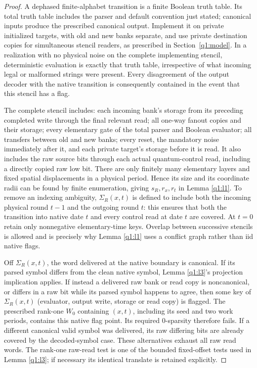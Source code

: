 \begin{proof}
A dephased finite-alphabet transition is a finite Boolean truth table. Its total truth table includes the parser and default convention just stated; canonical inputs produce the prescribed canonical output. Implement it on private initialized targets, with old and new banks separate, and use private destination copies for simultaneous stencil readers, as prescribed in Section~\ref{q1:model}. In a realization with no physical noise on the complete implementing stencil, deterministic evaluation is exactly that truth table, irrespective of what incoming legal or malformed strings were present. Every disagreement of the output decoder with the native transition is consequently contained in the event that this stencil has a flag.

The complete stencil includes: each incoming bank's storage from its preceding completed write through the final relevant read; all one-way fanout copies and their storage; every elementary gate of the total parser and Boolean evaluator; all transfers between old and new banks; every reset, the mandatory noise immediately after it, and each private target's storage before it is read. It also includes the raw source bits through each actual quantum-control read, including a directly copied raw low bit. There are only finitely many elementary layers and fixed spatial displacements in a physical period. Hence its size and its coordinate radii can be found by finite enumeration, giving \(s_{R},r_{x},r_{t}\) in Lemma \ref{q1:l1}. To remove an indexing ambiguity, \(\Sigma_{R}(x,t)\) is defined to include both the incoming physical round \(t-1\) and the outgoing round \(t\): this ensures that both the transition into native date \(t\) and every control read at date \(t\) are covered. At \(t=0\) retain only nonnegative elementary-time keys. Overlap between successive stencils is allowed and is precisely why Lemma \ref{q1:l1} uses a conflict graph rather than iid native flags.

Off \(\Sigma_{R}(x,t)\), the word delivered at the native boundary is canonical. If its parsed symbol differs from the clean native symbol, Lemma \ref{q1:l3}'s projection implication applies. If instead a delivered raw bank or read copy is noncanonical, or differs in a raw bit while its parsed symbol happens to agree, then some key of \(\Sigma_{R}(x,t)\) (evaluator, output write, storage or read copy) is flagged. The prescribed rank-one \(W_0\) containing \((x,t)\), including its seed and two work periods, contains this native flag point. Its required 0-sparsity therefore fails. If a different canonical valid symbol was delivered, its raw differing bits are already covered by the decoded-symbol case. These alternatives exhaust all raw read words. The rank-one raw-read test is one of the bounded fixed-offset tests used in Lemma \ref{q1:l3}; if necessary its identical translate is retained explicitly.


\end{proof}
